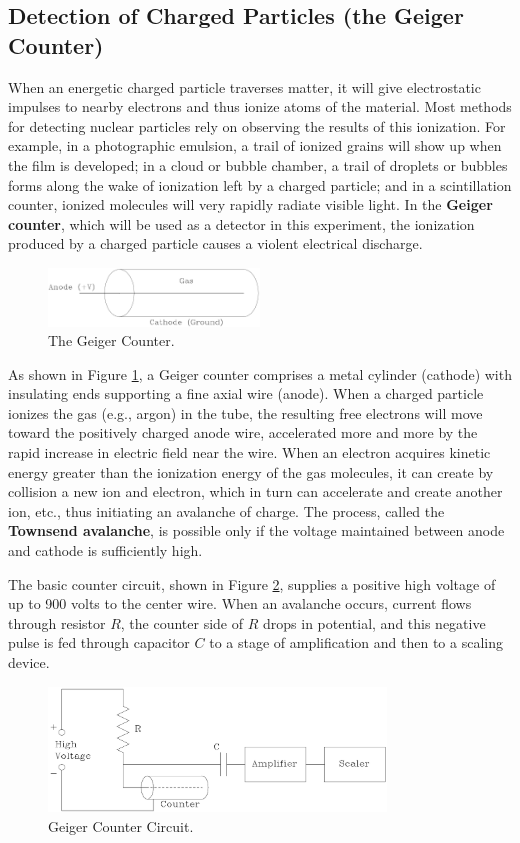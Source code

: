 \subsection{Detection of Charged Particles (the Geiger Counter)}
When an energetic charged particle traverses matter, it will give electrostatic impulses to nearby electrons and thus ionize atoms of the material. Most methods for detecting nuclear particles rely on observing the results of this ionization. For example, in a photographic emulsion, a trail of ionized grains will show up when the film is developed; in a cloud or bubble chamber, a trail of droplets or bubbles forms along the wake of ionization left by a charged particle; and in a scintillation counter, ionized molecules will very rapidly radiate visible light. In the \textbf{Geiger counter}, which will be used as a detector in this experiment, the ionization produced by a charged particle causes a violent electrical discharge.
\begin{figure}[h]
\centering
\includegraphics[width=0.5\textwidth]{./Exp10/pic/image3.png}
\caption{The Geiger Counter.}
\label{fig:counter}
\end{figure}

As shown in Figure {\ref{fig:counter}}, a Geiger counter comprises a metal cylinder (cathode) with insulating ends supporting a fine axial wire (anode). When a charged particle ionizes the gas (e.g., argon) in the tube, the resulting free electrons will move toward the positively charged anode wire, accelerated more and more by the rapid increase in electric field near the wire. When an electron acquires kinetic energy greater than the ionization energy of the gas molecules, it can create by collision a new ion and electron, which in turn can accelerate and create another ion, etc., thus initiating an avalanche of charge. The process, called the \textbf{Townsend avalanche}, is possible only if the voltage maintained between anode and cathode is sufficiently high.\myskip

The basic counter circuit, shown in Figure {\ref{fig:geiger}}, supplies a positive high voltage of up to 900 volts to the center wire. When an avalanche occurs, current flows through resistor $R$, the counter side of $R$ drops in potential, and this negative pulse is fed through capacitor $C$ to a stage of amplification and then to a scaling device.\myskip
\begin{figure}[h]
\centering
\includegraphics[width=0.8\textwidth]{./Exp10/pic/image4.png}
\caption{Geiger Counter Circuit.}
\label{fig:geiger}
\end{figure}

